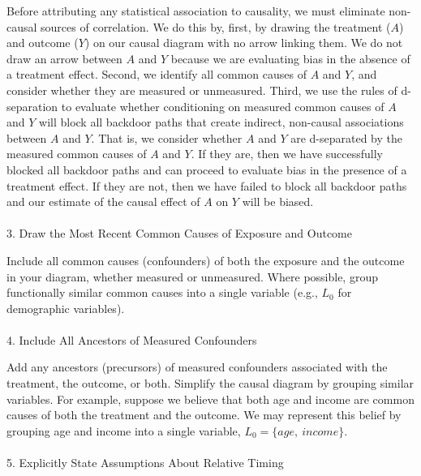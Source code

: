 \documentclass[
  singlecolumn]{article}
\makeatletter
\let\oldparagraph\paragraph
\renewcommand{\paragraph}{
    \@ifstar
      \xxxParagraphStar
      \xxxParagraphNoStar
  }
\newcommand{\xxxParagraphStar}[1]{\oldparagraph*{#1}\mbox{}}
\newcommand{\xxxParagraphNoStar}[1]{\oldparagraph{#1}\mbox{}}
\makeatother
\begin{document}
Before attributing any statistical association to causality, we must
eliminate non-causal sources of correlation. We do this by, first, by
drawing the treatment (\(A\)) and outcome (\(Y\)) on our causal diagram
with no arrow linking them. We do not draw an arrow between \(A\) and
\(Y\) because we are evaluating bias in the absence of a treatment
effect. Second, we identify all common causes of \(A\) and \(Y\), and
consider whether they are measured or unmeasured. Third, we use the
rules of d-separation to evaluate whether conditioning on measured
common causes of \(A\) and \(Y\) will block all backdoor paths that
create indirect, non-causal associations between \(A\) and \(Y\). That
is, we consider whether \(A\) and \(Y\) are d-separated by the measured
common causes of \(A\) and \(Y\). If they are, then we have successfully
blocked all backdoor paths and can proceed to evaluate bias in the
presence of a treatment effect. If they are not, then we have failed to
block all backdoor paths and our estimate of the causal effect of \(A\)
on \(Y\) will be biased.

\paragraph{3. Draw the Most Recent Common Causes of Exposure and
Outcome}\label{draw-the-most-recent-common-causes-of-exposure-and-outcome}

Include all common causes (confounders) of both the exposure and the
outcome in your diagram, whether measured or unmeasured. Where possible,
group functionally similar common causes into a single variable (e.g.,
\(L_0\) for demographic variables).

\paragraph{4. Include All Ancestors of Measured
Confounders}\label{include-all-ancestors-of-measured-confounders}

Add any ancestors (precursors) of measured confounders associated with
the treatment, the outcome, or both. Simplify the causal diagram by
grouping similar variables. For example, suppose we believe that both
age and income are common causes of both the treatment and the outcome.
We may represent this belief by grouping age and income into a single
variable, \(L_0 = \{age,~income\}\).

\paragraph{5. Explicitly State Assumptions About Relative
Timing}\label{explicitly-state-assumptions-about-relative-timing}
\end{document}
